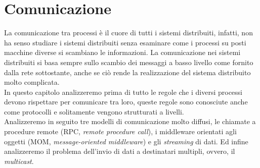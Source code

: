 \section{Comunicazione}\label{capitolo5}
La comunicazione tra processi è il cuore di tutti i sistemi distribuiti, infatti, non ha senso studiare i sistemi distribuiti senza esaminare come i processi su posti macchine diverse si scambiano le informazioni. La comunicazione nei sistemi distribuiti si basa sempre sullo scambio dei messaggi a basso livello come fornito dalla rete sottostante, anche se ciò rende la realizzazione del sistema distribuito molto complicata.\\
In questo capitolo analizzeremo prima di tutto le regole che i diversi processi devono rispettare per comunicare tra loro, queste regole sono conosciute anche come protocolli e solitamente vengono strutturati a livelli.\\
Analizzeremo in seguito tre modelli di comunicazione molto diffusi, le chiamate a procedure remote (RPC, \emph{remote procedure call}), i middleware orientati agli oggetti (MOM, \emph{message-oriented middleware}) e gli \emph{streaming} di dati. Ed infine analizzeremo il problema dell'invio di dati a destinatari multipli, ovvero, il \emph{multicast}.\\
